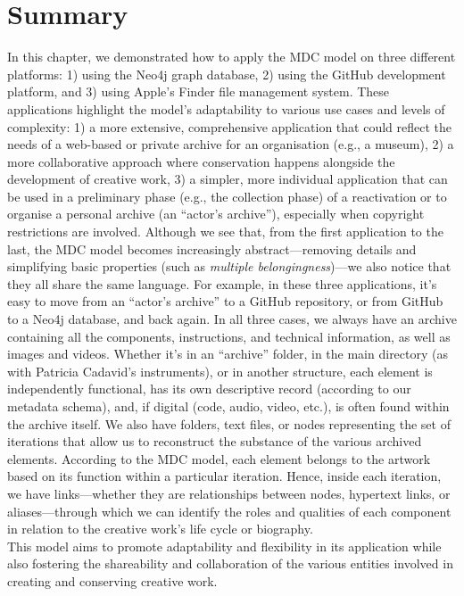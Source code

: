 \section{Summary}
In this chapter, we demonstrated how to apply the MDC model on three different platforms: 1) using the Neo4j graph database, 2) using the GitHub development platform, and 3) using Apple’s Finder file management system. These applications highlight the model’s adaptability to various use cases and levels of complexity: 1) a more extensive, comprehensive application that could reflect the needs of a web-based or private archive for an organisation (e.g., a museum), 2) a more collaborative approach where conservation happens alongside the development of creative work, 3) a simpler, more individual application that can be used in a preliminary phase (e.g., the collection phase) of a reactivation or to organise a personal archive (an “actor’s archive”), especially when copyright restrictions are involved. Although we see that, from the first application to the last, the MDC model becomes increasingly abstract—removing details and simplifying basic properties (such as \textit{multiple belongingness})—we also notice that they all share the same language. For example, in these three applications, it’s easy to move from an “actor’s archive” to a GitHub repository, or from GitHub to a Neo4j database, and back again. In all three cases, we always have an archive containing all the components, instructions, and technical information, as well as images and videos. Whether it’s in an “archive” folder, in the main directory (as with Patricia Cadavid’s instruments), or in another structure, each element is independently functional, has its own descriptive record (according to our metadata schema), and, if digital (code, audio, video, etc.), is often found within the archive itself. We also have folders, text files, or nodes representing the set of iterations that allow us to reconstruct the substance of the various archived elements. According to the MDC model, each element belongs to the artwork based on its function within a particular iteration. Hence, inside each iteration, we have links—whether they are relationships between nodes, hypertext links, or aliases—through which we can identify the roles and qualities of each component in relation to the creative work’s life cycle or biography.\\
This model aims to promote adaptability and flexibility in its application while also fostering the shareability and collaboration of the various entities involved in creating and conserving creative work.\\
